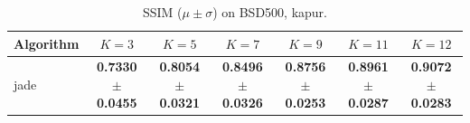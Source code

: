 \begin{table}[htbp]
\centering
\caption{SSIM ($\mu \pm \sigma$) on BSD500, kapur.}
\label{tab:exp1-kapur-ssim}
\begin{tabular}{lcccccc}
\toprule
Algorithm & $K=3$ & $K=5$ & $K=7$ & $K=9$ & $K=11$ & $K=12$ \\
\midrule
jade & \textbf{0.7330 $\pm$ 0.0455} & \textbf{0.8054 $\pm$ 0.0321} & \textbf{0.8496 $\pm$ 0.0326} & \textbf{0.8756 $\pm$ 0.0253} & \textbf{0.8961 $\pm$ 0.0287} & \textbf{0.9072 $\pm$ 0.0283} \\
\bottomrule
\end{tabular}
\end{table}